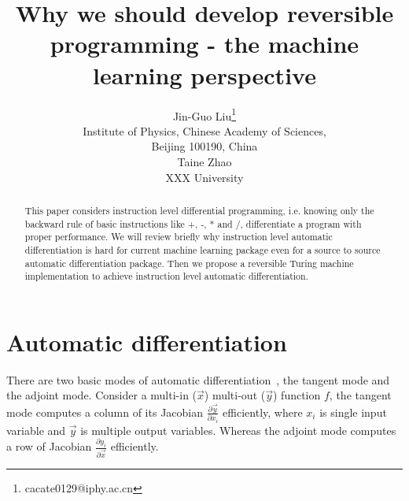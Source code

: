 \documentclass{article}
\newcommand{\<}{\langle}
\renewcommand{\>}{\rangle}
\begin{document}
\title{Why we should develop reversible programming - the machine learning perspective}

\author{Jin-Guo Liu\thanks{cacate0129@iphy.ac.cn}\\
Institute of Physics, Chinese Academy of Sciences,\\Beijing 100190, China\\
\And
Taine Zhao\\
XXX University}

\maketitle
\begin{abstract}
    This paper considers instruction level differential programming, i.e. knowing only the backward rule of basic instructions like +, -, * and /, differentiate a program with proper performance. We will review briefly why instruction level automatic differentiation is hard for current machine learning package even for a source to source automatic differentiation package. Then we propose a reversible Turing machine implementation to achieve instruction level automatic differentiation.
\end{abstract}

\section{Automatic differentiation}
There are two basic modes of automatic differentiation~\cite{thelongpaper}, the tangent mode\cite{forwarddiff} and the adjoint mode.
Consider a multi-in ($\vec{x}$) multi-out ($\vec{y}$) function $f$, the tangent mode computes a column of its Jacobian $\frac{\partial \vec{y}}{\partial x_i}$ efficiently, where $x_i$ is single input variable and $\vec{y}$ is multiple output variables.
Whereas the adjoint mode computes a row of Jacobian $\frac{\partial y_i}{\partial \vec{x}}$ efficiently.
\end{document}
